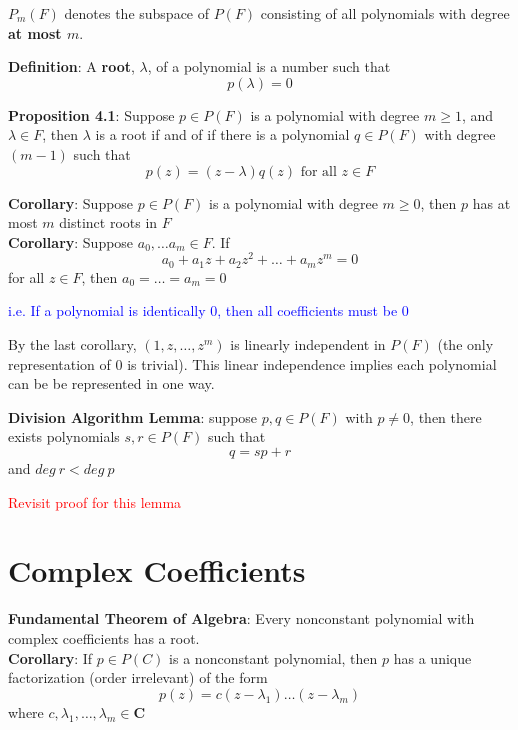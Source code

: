 \documentclass[a4paper, 10pt]{report}
\begin{document}
$P_m(F)$ denotes the subspace of $P(F)$ consisting of all polynomials with degree  \textbf{at most $m$}. \\

\begin{framed}
   \textbf{Definition}: A \textbf{root}, $\lambda$, of a polynomial is a number such that 
   \[
     p(\lambda) = 0
   \] 
\end{framed}

\begin{framed}
   \textbf{Proposition 4.1}: Suppose $p \in P(F)$ is a polynomial with degree $m \geq 1$, and  $\lambda \in F$, then $\lambda$ is a root if and of if there is a polynomial $q \in P(F)$ with degree $(m-1)$ such that
   \[
     p(z) = (z - \lambda) q(z) \text{ for all } z \in F
   \] 

   \textbf{Corollary}: Suppose $p \in P(F)$ is a polynomial with degree $ m \geq 0$, then  $p$ has at most $m$ distinct roots in $F$ \\

   \textbf{Corollary}: Suppose $a_0, \hdots a_m \in F$. If 
   \[
     a_0 + a_1 z + a_2 z^2 + \hdots + a_m z^m = 0
   \] 
   for all $z \in F$, then $a_0 = \hdots = a_m = 0$

   \textcolor{blue}{i.e. If a polynomial is identically 0, then all coefficients must be 0}
\end{framed}

By the last corollary, $(1, z, \hdots, z^m)$  is linearly independent in $P(F)$ (the only representation of $0$ is trivial). This linear independence implies each polynomial can be be represented in one way. 

\begin{framed}
   \textbf{Division Algorithm Lemma}: suppose $p, q \in P(F)$ with $p \neq 0$, then there exists polynomials  $s, r \in P(F)$ such that
    \[
     q = sp + r
   \] 
   and $deg\ r < deg\ p$
\end{framed}

\textcolor{red}{Revisit proof for this lemma}

\section{Complex Coefficients}

\begin{framed}
   \textbf{Fundamental Theorem of Algebra}: Every nonconstant polynomial with complex coefficients has a root.  \\

   \textbf{Corollary}: If $p \in P(C)$ is a nonconstant polynomial, then $p$ has a unique factorization (order irrelevant) of the form
   \[
     p(z) = c(z - \lambda_1) \hdots (z - \lambda_m) 
   \] 
   where $c, \lambda_1, \hdots , \lambda_m \in \textbf{C}$ 
\end{framed}
\end{document}
